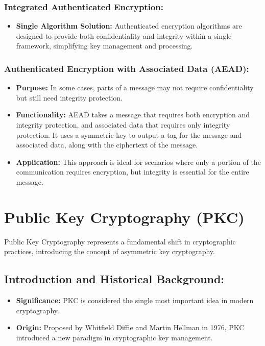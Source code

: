 \documentclass[12pt]{article}
\begin{document}
\subsubsection*{Integrated Authenticated Encryption:}
\begin{itemize}
    \item \textbf{Single Algorithm Solution:} Authenticated encryption algorithms are designed to provide both confidentiality and integrity within a single framework, simplifying key management and processing.
\end{itemize}

\subsubsection*{Authenticated Encryption with Associated Data (AEAD):}
\begin{itemize}
    \item \textbf{Purpose:} In some cases, parts of a message may not require confidentiality but still need integrity protection.
    \item \textbf{Functionality:} AEAD takes a message that requires both encryption and integrity protection, and associated data that requires only integrity protection. It uses a symmetric key to output a tag for the message and associated data, along with the ciphertext of the message.
    \item \textbf{Application:} This approach is ideal for scenarios where only a portion of the communication requires encryption, but integrity is essential for the entire message.
\end{itemize}



\section*{Public Key Cryptography (PKC)}

Public Key Cryptography represents a fundamental shift in cryptographic practices, introducing the concept of asymmetric key cryptography.

\subsection*{Introduction and Historical Background:}
\begin{itemize}
    \item \textbf{Significance:} PKC is considered the single most important idea in modern cryptography.
    \item \textbf{Origin:} Proposed by Whitfield Diffie and Martin Hellman in 1976, PKC introduced a new paradigm in cryptographic key management.
\end{itemize}
\end{document}
